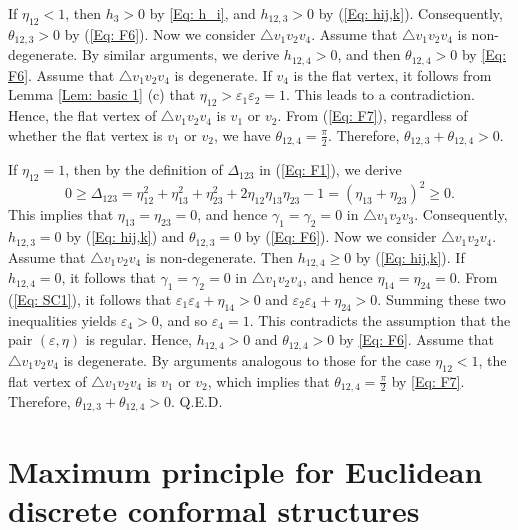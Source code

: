 \documentclass[12pt]{amsart}
\theoremstyle{definition}
\def\qed{\hfill{Q.E.D.}\smallskip}
\begin{document}
If $\eta_{12}<1$, then $h_3>0$ by \eqref{Eq: h_i}, and $h_{12,3}>0$ by (\ref{Eq: hij,k}). 
Consequently, $\theta_{12,3}>0$ by (\ref{Eq: F6}). 
Now we consider $\triangle v_1v_2v_4$. 
Assume that $\triangle v_1v_2v_4$ is non-degenerate. 
By similar arguments, we derive $h_{12,4}>0$, and then $\theta_{12,4}>0$ by \eqref{Eq: F6}. 
Assume that $\triangle v_1v_2v_4$ is degenerate. If $v_4$ is the flat vertex, 
it follows from Lemma \ref{Lem: basic 1} (c) that $\eta_{12}>\varepsilon_1\varepsilon_2=1$. 
This leads to a contradiction. 
Hence, the flat vertex of $\triangle v_1v_2v_4$ is $v_1$ or $v_2$.
From (\ref{Eq: F7}), regardless of whether the flat vertex is $v_1$ or $v_2$, we have $\theta_{12,4}=\frac{\pi}{2}$. 
Therefore, $\theta_{12,3}+\theta_{12,4}>0$. 

If $\eta_{12}=1$, then by the definition of $\Delta_{123}$ in (\ref{Eq: F1}), we derive
\begin{equation*}
0\geq \Delta_{123}
=\eta_{12}^2+\eta_{13}^2+\eta_{23}^2
+2\eta_{12}\eta_{13}\eta_{23}-1
=(\eta_{13}+\eta_{23})^2\geq 0.
\end{equation*}
This implies that $\eta_{13}=\eta_{23}=0$, and hence $\gamma_1=\gamma_2=0$ in $\triangle v_1v_2v_3$. Consequently, $h_{12,3}=0$ by (\ref{Eq: hij,k}) and $\theta_{12,3}=0$ by (\ref{Eq: F6}). 
Now we consider $\triangle v_1v_2v_4$. 
Assume that $\triangle v_1v_2v_4$ is non-degenerate. 
Then $h_{12,4}\geq0$ by (\ref{Eq: hij,k}). 
If $h_{12,4}=0$, it follows that $\gamma_1=\gamma_2=0$ in $\triangle v_1v_2v_4$, and hence $\eta_{14}=\eta_{24}=0$. 
From (\ref{Eq: SC1}), it follows that $\varepsilon_1\varepsilon_4+\eta_{14}>0$ and $\varepsilon_2\varepsilon_4+\eta_{24}>0$. 
Summing these two inequalities yields $\varepsilon_4>0$, and so $\varepsilon_4=1$. 
This contradicts the assumption that the pair $(\varepsilon,\eta)$ is regular. 
Hence, $h_{12,4}>0$ and $\theta_{12,4}>0$ by \eqref{Eq: F6}. 
Assume that $\triangle v_1v_2v_4$ is degenerate. 
By arguments analogous to those for the case $\eta_{12}<1$, the flat vertex of $\triangle v_1v_2v_4$ is $v_1$ or $v_2$,
which implies that $\theta_{12,4}=\frac{\pi}{2}$ by \eqref{Eq: F7}. 
Therefore, $\theta_{12,3}+\theta_{12,4}>0$.
\qed


\section{Maximum principle for Euclidean discrete conformal structures}
\label{Sec: MP-E}
\end{document}

